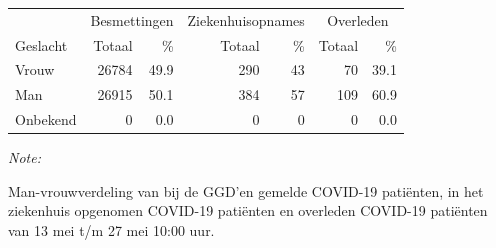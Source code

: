 \documentclass[
  english,
  man,floatsintext]{apa6}
\begin{document}
\begin{table}
\centering\begingroup\fontsize{11}{13}\selectfont

\begin{threeparttable}
\begin{tabular}{lrrrrrr}
\toprule
\multicolumn{1}{c}{ } & \multicolumn{2}{c}{Besmettingen} & \multicolumn{2}{c}{Ziekenhuisopnames} & \multicolumn{2}{c}{Overleden} \\
\cmidrule(l{3pt}r{3pt}){2-3} \cmidrule(l{3pt}r{3pt}){4-5} \cmidrule(l{3pt}r{3pt}){6-7}
Geslacht & Totaal & \% & Totaal & \% & Totaal & \%\\
\midrule
Vrouw & 26784 & 49.9 & 290 & 43 & 70 & 39.1\\
Man & 26915 & 50.1 & 384 & 57 & 109 & 60.9\\
Onbekend & 0 & 0.0 & 0 & 0 & 0 & 0.0\\
\bottomrule
\end{tabular}
\begin{tablenotes}
\item \textit{Note: } 
\item Man-vrouwverdeling van bij de GGD’en gemelde COVID-19 patiënten, in het ziekenhuis opgenomen COVID-19 patiënten en overleden COVID-19 patiënten van 13 mei t/m 27 mei 10:00 uur.
\end{tablenotes}
\end{threeparttable}
\endgroup{}
\end{table}
\newpage
\end{document}
